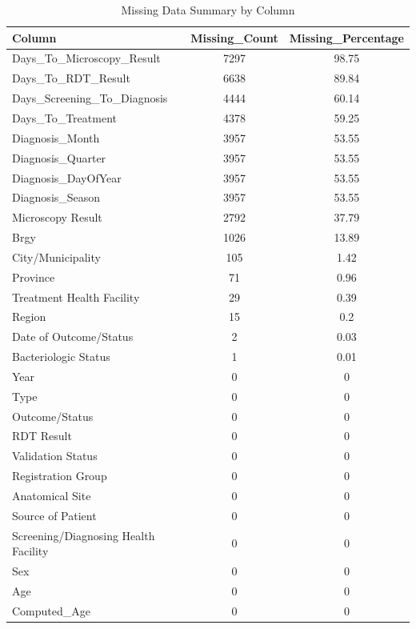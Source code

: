 \begin{table}[htbp]

\caption{Missing Data Summary by Column}
\label{tab:missing_data_summary}
\begin{tabular}{lcc}

\toprule

Column & Missing\_Count & Missing\_Percentage \\

\midrule

Days\_To\_Microscopy\_Result & 7297 & 98.75 \\
Days\_To\_RDT\_Result & 6638 & 89.84 \\
Days\_Screening\_To\_Diagnosis & 4444 & 60.14 \\
Days\_To\_Treatment & 4378 & 59.25 \\
Diagnosis\_Month & 3957 & 53.55 \\
Diagnosis\_Quarter & 3957 & 53.55 \\
Diagnosis\_DayOfYear & 3957 & 53.55 \\
Diagnosis\_Season & 3957 & 53.55 \\
Microscopy Result & 2792 & 37.79 \\
Brgy & 1026 & 13.89 \\
City/Municipality & 105 & 1.42 \\
Province & 71 & 0.96 \\
Treatment Health Facility & 29 & 0.39 \\
Region & 15 & 0.2 \\
Date of Outcome/Status & 2 & 0.03 \\
Bacteriologic Status & 1 & 0.01 \\
Year & 0 & 0 \\
Type & 0 & 0 \\
Outcome/Status & 0 & 0 \\
RDT Result & 0 & 0 \\
Validation Status & 0 & 0 \\
Registration Group & 0 & 0 \\
Anatomical Site & 0 & 0 \\
Source of Patient & 0 & 0 \\
Screening/Diagnosing Health Facility & 0 & 0 \\
Sex & 0 & 0 \\
Age & 0 & 0 \\
Computed\_Age & 0 & 0 \\

\bottomrule

\end{tabular}

\end{table}